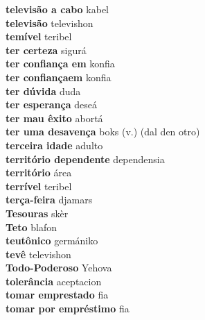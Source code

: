 \textbf{ televisão a cabo  } kabel \\
\textbf{ televisão  } televishon \\
\textbf{ temível  } teribel \\
\textbf{ ter certeza  } sigurá \\
\textbf{ ter confiança em  } konfia \\
\textbf{ ter confiançaem  } konfia \\
\textbf{ ter dúvida  } duda \\
\textbf{ ter esperança  } deseá \\
\textbf{ ter mau êxito  } abortá \\
\textbf{ ter uma desavença  } boks (v.) (dal den otro) \\
\textbf{ terceira idade  } adulto \\
\textbf{ território dependente  } dependensia \\
\textbf{ território  } área \\
\textbf{ terrível  } teribel \\
\textbf{ terça-feira  } djamars \\
\textbf{ Tesouras  } skèr \\
\textbf{ Teto  } blafon \\
\textbf{ teutônico  } germániko \\
\textbf{ tevê  } televishon \\
\textbf{ Todo-Poderoso  } Yehova \\
\textbf{ tolerância  } aceptacion \\
\textbf{ tomar emprestado  } fia \\
\textbf{ tomar por empréstimo  } fia \\
